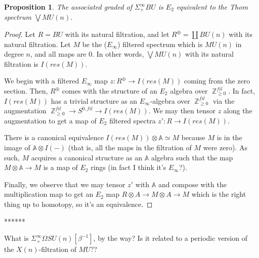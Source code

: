 \documentclass[oneside]{amsart}
\theoremstyle{definition}
\theoremstyle{plain}
\newtheorem{prop}[nul]{Proposition}
\DeclareMathOperator{\Z}{\mathbb{Z}}
\begin{document}
\begin{prop}The associated graded of $\Sigma^{\infty}_+BU$ is $E_2$ equivalent to the Thom spectrum $\bigvee MU(n).$
\end{prop}
\begin{proof}
Let $R = BU$ with its natural filtration, and let $R^{\oplus} = \coprod BU(n)$ with its natural filtration.  Let $M$ be the ($E_\infty$) filtered spectrum which is $MU(n)$ in degree $n$, and all maps are $0$.  In other words, $\bigvee MU(n)$ with its natural filtration is $I(res(M))$.  

We begin with a filtered $E_\infty$ map $z:R^\oplus \to I(res(M))$ coming from the zero section.  Then, $R^\oplus$ comes with the structure of an $E_2$ algebra over $\Z_{\geq 0}^{fil}$.  In fact, $I(res(M))$  has a trivial structure as an $E_\infty$-algebra over $\Z_{\geq 0}^{fil}$ via the augmentation $\Z_{\geq 0}^{fil}\to S^{0,fil} \to I(res(M))$.  We may then tensor $z$ along the augmentation to get a map of $E_2$ filtered spectra $z':R \to I(res(M))$.  

There is a canonical equivalence $I(res(M)) \otimes \mathbb{A} \simeq M$ because $M$ is in the image of $\mathbb{A} \otimes I(-)$ (that is, all the maps in the filtration of $M$ were zero).  As such, $M$ acquires a canonical structure as an $\mathbb{A}$ algebra such that the map $M \otimes \mathbb{A} \to M$ is a map of $E_2$ rings (in fact I think it's $E_\infty$?).  

Finally, we observe that we may tensor $z'$ with $\mathbb{A}$ and compose with the multiplication map to get an $E_2$ map $R\otimes A \to M \otimes A \to M$ which is the right thing up to homotopy, so it's an equivalence.  
\end{proof}

******  

What is $\Sigma^{\infty}_+ \Omega SU(n)[\beta^{-1}]$, by the way?  Is it related to a periodic version of the $X(n)$-filtration of $MU$??


\end{document}
